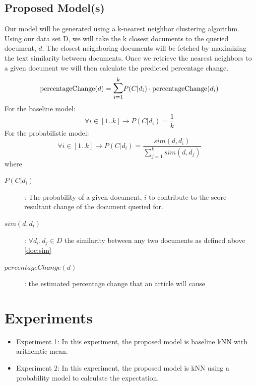 \documentclass[11pt,letterpaper]{article}
\newcommand{\blue}[1]{\textcolor{RoyalBlue}{#1}}
\newcommand{\instructions}[1]{\blue{\textit{#1}}}
\begin{document}
\subsection{Proposed Model(s)}
\label{sec:proposed-models}
Our model will be generated using a k-nearest neighbor clustering algorithm.
Using our data set D, we will take the k closest documents to the
queried document, \(d\). The closest neighboring documents will be fetched by
maximizing the text similarity between documents. Once we retrieve the
nearest neighbors to a given document we will then calculate the predicted percentage change.
\begin{equation}\label{doc:pDelta}
	\text{percentageChange}(d) = \mathlarger{\mathlarger{\sum}}^k_{i=1} P(C | d_i) \cdot \text{percentageChange}(d_i)
\end{equation}
For the baseline model:
\begin{equation}\label{doc:prob}
	 \forall i \in [1..k] \rightarrow P(C | d_i) = \frac{ 1 }{ k }
\end{equation}
For the probabilistic model:
\begin{equation}\label{doc:prob}
	 \forall i \in [1..k] \rightarrow P(C | d_i) = \frac{ sim(d,d_i) }{\sum^k_{j=1} sim(d, d_j)}
\end{equation}
where
\begin{description}
	\item[\(P(C | d_i)\)] : The probability of a given document, \( i \) to contribute to the score resultant change of the document queried for.
	\item[\textbf{\(sim(d,d_i)\)}] : \( \forall d_i, d_j \in D \) the similarity between any two documents as defined above \eqref{doc:sim}
	\item[\(percentageChange(d)\)] : the estimated percentage change that an article will cause
\end{description}

\section{Experiments}
\begin{itemize}
  \item Experiment 1: In this experiment, the proposed model is
  baseline kNN with arithemtic mean.
  \item Experiment 2: In this experiment, the proposed model is
  kNN using a probability model to calculate the expectation.
\end{itemize}
\end{document}
